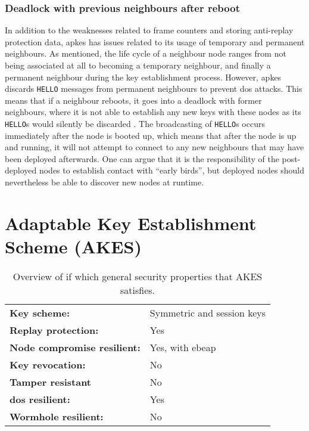 \subsubsection{Deadlock with previous neighbours after reboot}

In addition to the weaknesses related to frame counters and storing anti-replay protection data, \gls{apkes} has issues related to its usage of temporary and permanent neighbours. As mentioned, the life cycle of a neighbour node ranges from not being associated at all to becoming a temporary neighbour, and finally a permanent neighbour during the key establishment process. However, \gls{apkes} discards \texttt{HELLO} messages from permanent neighbours to prevent \gls{dos} attacks. This means that if a neighbour reboots, it goes into a deadlock with former neighbours, where it is not able to establish any new keys with these nodes as its \texttt{HELLO}s would silently be discarded \cite{krentz2015handling}. The broadcasting of \texttt{HELLO}s occurs immediately after the node is booted up, which means that after the node is up and running, it will not attempt to connect to any new neighbours that may have been deployed afterwards. One can argue that it is the responsibility of the post-deployed nodes to establish contact with ``early birds'', but deployed nodes should nevertheless be able to discover new nodes at runtime. 




\section{Adaptable Key Establishment Scheme (AKES)}


\begin{table}[h]
\centering
\begin{tabular}{|l|l|} \hline
\textbf{Key scheme:} & Symmetric and session keys  \\
\textbf{Replay protection:}	 & Yes  \\
\textbf{Node compromise resilient:} & Yes, with \gls{ebeap}  \\
\textbf{Key revocation:} & No \\
\textbf{Tamper resistant} & No \\
\textbf{\gls{dos} resilient:} & Yes \\
\textbf{Wormhole resilient:} & No \\ \hline
\end{tabular}
\caption{Overview of if which general security properties that AKES satisfies.}
\label{tab:akes-props}
\end{table}



